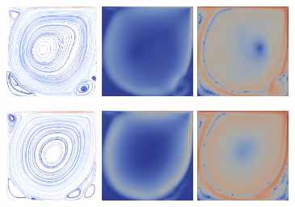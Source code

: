 \documentclass[english, nochinese]{pkupaper}
\begin{document}
\begin{figure}[htbp]
{
\centering
{
\includegraphics[width=3cm]{Results/Figure01b.png}
\includegraphics[width=3cm]{Results/Figure01a.png}
\includegraphics[width=3cm]{Results/Figure02e.png}
}

{
\includegraphics[width=3cm]{Results/Figure01e.png}
\includegraphics[width=3cm]{Results/Figure01d.png}
\includegraphics[width=3cm]{Results/Figure02j.png}
}

}
\end{figure}
\end{document}
